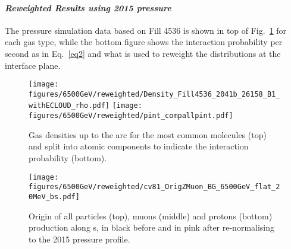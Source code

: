 \paragraph{\textit{Reweighted Results using 2015 pressure}}

The pressure simulation data based on Fill 4536 is shown in top of Fig.~\ref{pressure2015} for each gas type, while the bottom figure shows the interaction probability per second as in Eq.~\ref{eq2} and what is used to reweight the distributions at the interface plane.

\begin{figure}
\begin{center}
  \texttt{[image: figures/6500GeV/reweighted/Density\_Fill4536\_2041b\_26158\_B1\_withECLOUD\_rho.pdf]}
  \texttt{[image: figures/6500GeV/reweighted/pint\_compallpint.pdf]}
\end{center}
\vspace{-0.6cm}
 \caption{Gas densities up to the arc for the most common molecules (top) and split into atomic components to indicate the interaction probability (bottom).
  \label{pressure2015}}
\end{figure}

\begin{figure}
\begin{center}
  \texttt{[image: figures/6500GeV/reweighted/cv81\_OrigZMuon\_BG\_6500GeV\_flat\_20MeV\_bs.pdf]}
\end{center}
\vspace{-0.6cm}
 \caption{Origin of all particles (top), muons (middle) and protons (bottom) production along s, in black before and in pink after re-normalising to the 2015 pressure profile. 
  \label{fig:OrigZ6p5}}
\end{figure}

